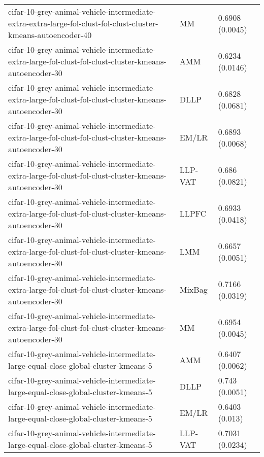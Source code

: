 \begin{longtable}{lll}
cifar-10-grey-animal-vehicle-intermediate-extra-extra-large-fol-clust-fol-clust-cluster-kmeans-autoencoder-40 &        MM &                       0.6908 (0.0045) \\
      cifar-10-grey-animal-vehicle-intermediate-extra-large-fol-clust-fol-clust-cluster-kmeans-autoencoder-30 &       AMM &                       0.6234 (0.0146) \\
      cifar-10-grey-animal-vehicle-intermediate-extra-large-fol-clust-fol-clust-cluster-kmeans-autoencoder-30 &      DLLP &                       0.6828 (0.0681) \\
      cifar-10-grey-animal-vehicle-intermediate-extra-large-fol-clust-fol-clust-cluster-kmeans-autoencoder-30 &     EM/LR &                       0.6893 (0.0068) \\
      cifar-10-grey-animal-vehicle-intermediate-extra-large-fol-clust-fol-clust-cluster-kmeans-autoencoder-30 &   LLP-VAT &                        0.686 (0.0821) \\
      cifar-10-grey-animal-vehicle-intermediate-extra-large-fol-clust-fol-clust-cluster-kmeans-autoencoder-30 &     LLPFC &                       0.6933 (0.0418) \\
      cifar-10-grey-animal-vehicle-intermediate-extra-large-fol-clust-fol-clust-cluster-kmeans-autoencoder-30 &       LMM &                       0.6657 (0.0051) \\
      cifar-10-grey-animal-vehicle-intermediate-extra-large-fol-clust-fol-clust-cluster-kmeans-autoencoder-30 &    MixBag &                       0.7166 (0.0319) \\
      cifar-10-grey-animal-vehicle-intermediate-extra-large-fol-clust-fol-clust-cluster-kmeans-autoencoder-30 &        MM &                       0.6954 (0.0045) \\
                          cifar-10-grey-animal-vehicle-intermediate-large-equal-close-global-cluster-kmeans-5 &       AMM &                       0.6407 (0.0062) \\
                          cifar-10-grey-animal-vehicle-intermediate-large-equal-close-global-cluster-kmeans-5 &      DLLP &                        0.743 (0.0051) \\
                          cifar-10-grey-animal-vehicle-intermediate-large-equal-close-global-cluster-kmeans-5 &     EM/LR &                        0.6403 (0.013) \\
                          cifar-10-grey-animal-vehicle-intermediate-large-equal-close-global-cluster-kmeans-5 &   LLP-VAT &                       0.7031 (0.0234) \\

\end{longtable}
